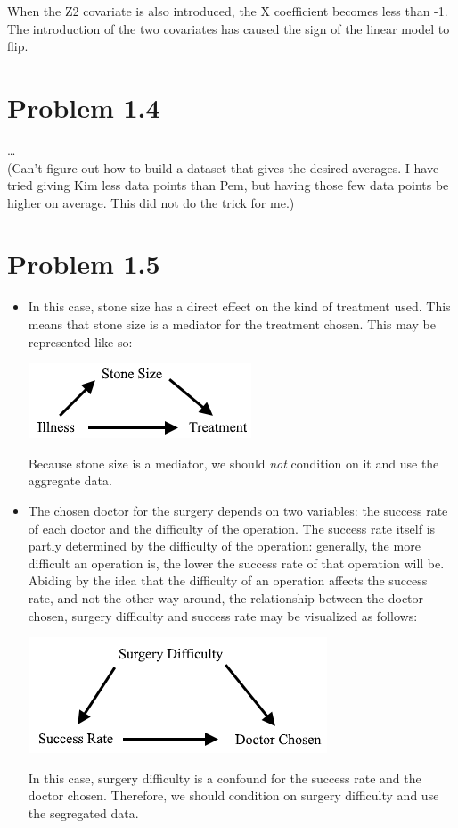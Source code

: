 \documentclass[a4paper]{article}
\begin{document}
When the Z2 covariate is also introduced, the X coefficient becomes less than -1.
The introduction of the two covariates has caused the sign of the linear model to flip.

\section*{Problem 1.4}
\dots\\
(Can't figure out how to build a dataset that gives the desired averages. I have tried giving Kim less data points than Pem, but having those few data points be higher on average. This did not do the trick for me.)

\section*{Problem 1.5}
\begin{itemize}
    \item In this case, stone size has a direct effect on the kind of treatment used. 
    This means that stone size is a mediator for the treatment chosen. 
    This may be represented like so: 
    \begin{center}
        \includegraphics*{Images/1.5.1.png}
    \end{center}
    Because stone size is a mediator, we should \textit{not} condition on it and use the aggregate data.
    \item The chosen doctor for the surgery depends on two variables: the success rate of each doctor and the difficulty of the operation. 
    The success rate itself is partly determined by the difficulty of the operation: 
    generally, the more difficult an operation is, the lower the success rate of that operation will be. 
    Abiding by the idea that the difficulty of an operation affects the success rate, and not the other way around, 
    the relationship between the doctor chosen, surgery difficulty and success rate may be visualized as follows: 
    \begin{center}
        \includegraphics*{Images/1.5.2.png}
    \end{center}
    In this case, surgery difficulty is a confound for the success rate and the doctor chosen. 
    Therefore, we should condition on surgery difficulty and use the segregated data.
\end{itemize}
\end{document}
